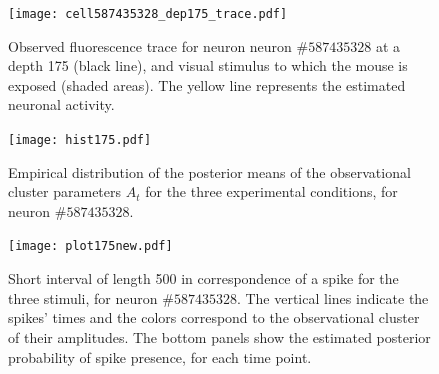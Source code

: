 \newpage
\begin{figure}
	\centerline{\texttt{[image: cell587435328\_dep175\_trace.pdf]}}
	\caption[Observed fluorescence trace of neuron $\#587435328$ from the Allen Brain Observatory data and estimated neuronal activity.]{Observed fluorescence trace for neuron neuron $\#587435328$ at a depth 175 (black line), and visual stimulus to which the mouse is exposed (shaded areas). The yellow line represents the estimated neuronal activity.}
	\label{fig:cell2_trace}
\end{figure}

\begin{figure}
	\centering
	\begin{minipage}{0.45\textwidth}
		\centering
		\texttt{[image: hist175.pdf]}
		\caption[Distribution of the observational cluster parameters for the three experimental conditions of neuron $\#587435328$.]{Empirical distribution of the posterior means of the observational cluster parameters $A_t$ for the three experimental conditions, for neuron $\#587435328$.}
		\label{fig:A_distr2}
	\end{minipage}\hfill
	\begin{minipage}{0.45\textwidth}
		\centering
		\texttt{[image: plot175new.pdf]}
			\caption[Visual representation of the estimated spikes and their amplitudes in the calcium trace of neuron $\#587435328$.]{Short interval of length 500 in correspondence of a spike for the three stimuli, for neuron $\#587435328$. The vertical lines indicate the spikes' times and the colors correspond to the observational cluster of their amplitudes. The bottom panels show the estimated posterior probability of spike presence, for each time point.}
		\label{fig:spike_color2}
	\end{minipage}
\end{figure}









